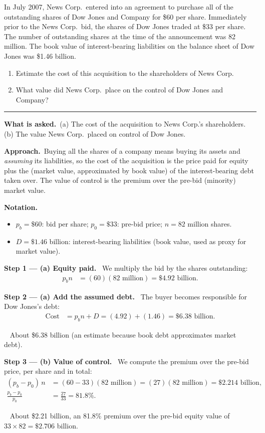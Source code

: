 \documentclass[11pt,a4paper]{article}
\newcommand{\notation}{\par\noindent\textbf{Notation.}}
\newcommand{\step}[2]{\par\medskip\noindent\textbf{Step #1 --- #2.}~}
\newcommand{\asked}{\par\medskip\noindent\textbf{What is asked.}~}
\newcommand{\approach}{\par\smallskip\noindent\textbf{Approach.}~}
\newcommand{\answer}[1]{\par\smallskip\noindent\fbox{\textbf{Answer #1.}}~}
\newcommand{\stmtend}{\par\endgroup\nopagebreak\noindent\rule{\linewidth}{0.4pt}\par\medskip}
\begin{document}
In July 2007, News Corp.~entered into an agreement to purchase all of the outstanding shares of Dow
Jones and Company for \$60 per share. Immediately prior to the News Corp.~bid, the shares of Dow
Jones traded at \$33 per share. The number of outstanding shares at the time of the announcement was
82 million. The book value of interest-bearing liabilities on the balance sheet of Dow Jones was
\$1.46 billion.

\begin{enumerate}
\def\labelenumi{\alph{enumi}.}
\item
  Estimate the cost of this acquisition to the shareholders of News Corp.
\item
  What value did News Corp.~place on the control of Dow Jones and Company?
\end{enumerate}
\stmtend

\asked (a) The cost of the acquisition to News Corp.'s shareholders. (b) The value News Corp.\ placed
on control of Dow Jones.

\approach Buying all the shares of a company means buying its assets and \emph{assuming} its
liabilities, so the cost of the acquisition is the price paid for equity plus the (market value,
approximated by book value) of the interest-bearing debt taken over. The value of control is the premium
over the pre-bid (minority) market value.

\notation
\begin{itemize}
  \item $p_b=\$60$: bid per share; $p_0=\$33$: pre-bid price; $n=82$ million shares.
  \item $D=\$1.46$ billion: interest-bearing liabilities (book value, used as proxy for market value).
\end{itemize}

\step{1}{(a) Equity paid} We multiply the bid by the shares outstanding:
\begin{align}
  p_b n &= (60)(82\text{ million}) = \$4.92\text{ billion}. \label{r9e6-eq}
\end{align}

\step{2}{(a) Add the assumed debt} The buyer becomes responsible for Dow Jones's debt:
\begin{align}
  \text{Cost} &= p_b n + D = (4.92)+(1.46) = \$6.38\text{ billion}. \label{r9e6-cost}
\end{align}
\answer{(a)} About \$6.38 billion (an estimate because book debt approximates market debt).

\step{3}{(b) Value of control} We compute the premium over the pre-bid price, per share and in total:
\begin{align}
  (p_b-p_0)\,n &= (60-33)(82\text{ million}) = (27)(82\text{ million}) = \$2.214\text{ billion}, \label{r9e6-ctrl}\\
  \frac{p_b-p_0}{p_0} &= \frac{27}{33} = 81.8\%. \nonumber
\end{align}
\answer{(b)} About \$2.21 billion, an 81.8\% premium over the pre-bid equity value of $33\times 82=\$2.706$ billion.
\end{document}
